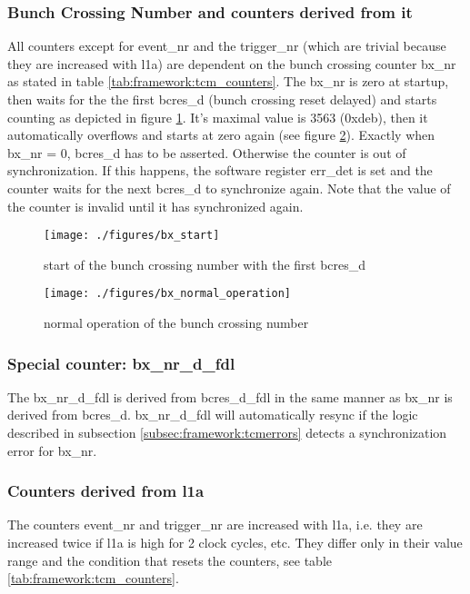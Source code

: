 \subsubsection{Bunch Crossing Number and counters derived from it}
All counters except for event\_nr and the trigger\_nr (which are trivial because they are increased with l1a) are dependent on the bunch crossing counter bx\_nr as stated in table \ref{tab:framework:tcm_counters}. The bx\_nr is zero at startup, then waits for the the first bcres\_d (bunch crossing reset delayed) and starts counting as depicted in figure \ref{fig:bx_start}. It's maximal value is 3563 (0xdeb), then it automatically overflows and starts at zero again (see figure \ref{fig:bx_normal_operation}). Exactly when bx\_nr = 0, bcres\_d has to be asserted. Otherwise the counter is out of synchronization. If this happens, the software register err\_det is set and the counter waits for the next bcres\_d to synchronize again. Note that the value of the counter is invalid until it has synchronized again.

\begin{figure}[ht]
  \texttt{[image: ./figures/bx\_start]}
  \caption{start of the bunch crossing number with the first bcres\_d}
  \label{fig:bx_start}
\end{figure}

\begin{figure}[ht]
  \texttt{[image: ./figures/bx\_normal\_operation]}
  \caption{normal operation of the bunch crossing number}
  \label{fig:bx_normal_operation}
\end{figure}

\subsubsection{Special counter: bx\_nr\_d\_fdl}
The bx\_nr\_d\_fdl is derived from bcres\_d\_fdl in the same manner as bx\_nr is derived from bcres\_d. bx\_nr\_d\_fdl will automatically resync if the logic described in subsection \ref{subsec:framework:tcmerrors} detects a synchronization error for bx\_nr.

\subsubsection{Counters derived from l1a}
The counters event\_nr and trigger\_nr are increased with l1a, i.e. they are increased twice if l1a is high for 2 clock cycles, etc. They differ only in their value range and the condition that resets the counters, see table \ref{tab:framework:tcm_counters}.

